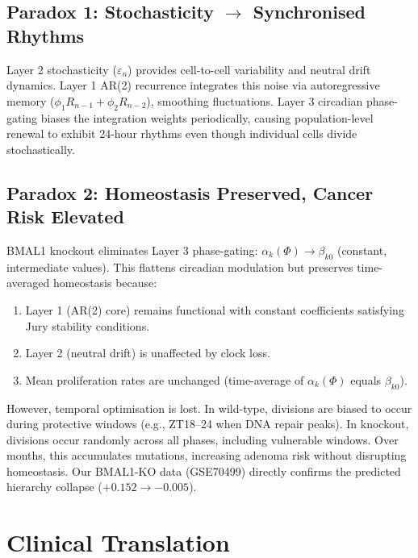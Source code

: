 \documentclass[11pt,letterpaper]{article}
\begin{document}
\subsection{Paradox 1: Stochasticity $\to$ Synchronised Rhythms}

Layer 2 stochasticity ($\varepsilon_n$) provides cell-to-cell variability and neutral drift dynamics. Layer 1 AR(2) recurrence integrates this noise via autoregressive memory ($\phi_1 R_{n-1} + \phi_2 R_{n-2}$), smoothing fluctuations. Layer 3 circadian phase-gating biases the integration weights periodically, causing population-level renewal to exhibit 24-hour rhythms even though individual cells divide stochastically.

\subsection{Paradox 2: Homeostasis Preserved, Cancer Risk Elevated}

BMAL1 knockout eliminates Layer 3 phase-gating: $\alpha_k(\Phi) \to \beta_{k0}$ (constant, intermediate values). This flattens circadian modulation but preserves time-averaged homeostasis because:

\begin{enumerate}
\item Layer 1 (AR(2) core) remains functional with constant coefficients satisfying Jury stability conditions.
\item Layer 2 (neutral drift) is unaffected by clock loss.
\item Mean proliferation rates are unchanged (time-average of $\alpha_k(\Phi)$ equals $\beta_{k0}$).
\end{enumerate}

However, temporal optimisation is lost. In wild-type, divisions are biased to occur during protective windows (e.g., ZT18--24 when DNA repair peaks). In knockout, divisions occur randomly across all phases, including vulnerable windows. Over months, this accumulates mutations, increasing adenoma risk without disrupting homeostasis. Our BMAL1-KO data (GSE70499) directly confirms the predicted hierarchy collapse ($+0.152 \to -0.005$).


\section{Clinical Translation}
\label{sec:clinical}
\end{document}
